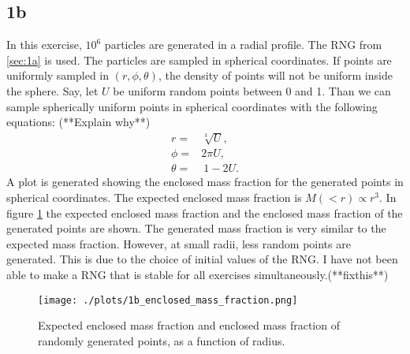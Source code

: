 \subsection*{1b}
In this exercise, $10^6$ particles are generated in a radial profile. The RNG from \ref{sec:1a} is used. The particles are sampled in spherical coordinates. If points are uniformly sampled in $(r,\phi, \theta)$, the density of points will not be uniform inside the sphere. Say, let $U$ be uniform random points between 0 and 1. Than we can sample spherically uniform points in spherical coordinates with the following equations: (**Explain why**)
\begin{eqnarray}
  r =& \sqrt[3]{U}, \\
  \phi =& 2\pi U, \\
  \theta =&\ 1 - 2U.
\end{eqnarray}
A plot is generated showing the enclosed mass fraction for the generated points in spherical coordinates. The expected enclosed mass fraction is $M(<r) \propto r^3$. In figure \ref{fig:1b} the expected enclosed mass fraction and the enclosed mass fraction of the generated points are shown. The generated mass fraction is very similar to the expected mass fraction.  However, at small radii, less random points are generated. This is due to the choice of initial values of the RNG. I have not been able to make a RNG that is stable for all exercises simultaneously.(**fixthis**)

\begin{figure}[!ht]
  \centering
  \texttt{[image: ./plots/1b\_enclosed\_mass\_fraction.png]}
  \caption{Expected enclosed mass fraction and enclosed mass fraction of randomly generated points, as a function of radius.}
  \label{fig:1b}
\end{figure}

